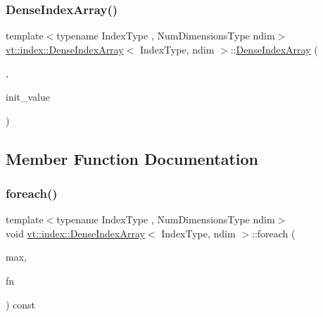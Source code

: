 \mbox{\label{structvt_1_1index_1_1_dense_index_array_aa53dfdb3cad352ad2d1d5701d5a4eb3f}} 
\subsubsection{\texorpdfstring{Dense\+Index\+Array()}{DenseIndexArray()}\hspace{0.1cm}{\footnotesize\ttfamily [6/6]}}
{\footnotesize\ttfamily template$<$typename Index\+Type , Num\+Dimensions\+Type ndim$>$ \\
\hyperlink{structvt_1_1index_1_1_dense_index_array}{vt\+::index\+::\+Dense\+Index\+Array}$<$ Index\+Type, ndim $>$\+::\hyperlink{structvt_1_1index_1_1_dense_index_array}{Dense\+Index\+Array} (\begin{DoxyParamCaption}\item[{Dense\+Index\+Array\+Single\+Init\+Tag}]{,  }\item[{Index\+Type const \&}]{init\+\_\+value }\end{DoxyParamCaption})}



\subsection{Member Function Documentation}
\mbox{\label{structvt_1_1index_1_1_dense_index_array_abe8fc4be882d51e37404e44e87da5caa}} 
\subsubsection{\texorpdfstring{foreach()}{foreach()}\hspace{0.1cm}{\footnotesize\ttfamily [1/2]}}
{\footnotesize\ttfamily template$<$typename Index\+Type , Num\+Dimensions\+Type ndim$>$ \\
void \hyperlink{structvt_1_1index_1_1_dense_index_array}{vt\+::index\+::\+Dense\+Index\+Array}$<$ Index\+Type, ndim $>$\+::foreach (\begin{DoxyParamCaption}\item[{\hyperlink{structvt_1_1index_1_1_dense_index_array_a6915511f6a82dff2522d6e8c2be20f2a}{This\+Index\+Type}}]{max,  }\item[{\hyperlink{structvt_1_1index_1_1_dense_index_array_ab44b9e5a65d28520268523fbe99f6a9d}{Apply\+Type}}]{fn }\end{DoxyParamCaption}) const}

